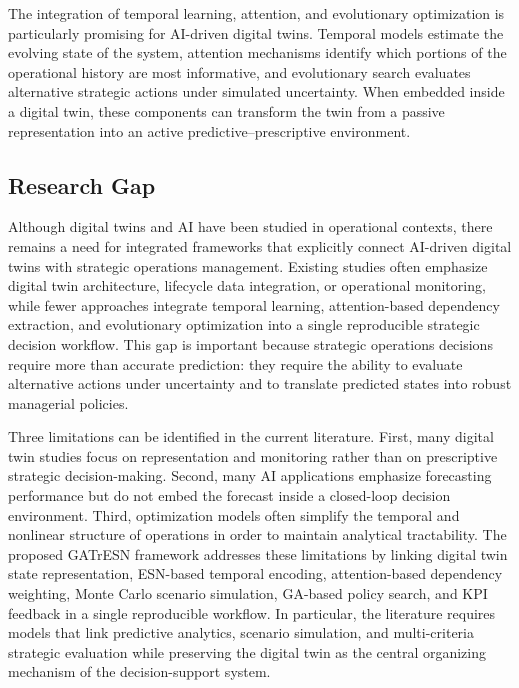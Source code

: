 \documentclass[apajournal,article,submit,pdftex,moreauthors]{Definitions/mdpi}
\begin{document}
The integration of temporal learning, attention, and evolutionary optimization is particularly promising for AI-driven digital twins. Temporal models estimate the evolving state of the system, attention mechanisms identify which portions of the operational history are most informative, and evolutionary search evaluates alternative strategic actions under simulated uncertainty. When embedded inside a digital twin, these components can transform the twin from a passive representation into an active predictive--prescriptive environment.

\subsection{Research Gap}
Although digital twins and AI have been studied in operational contexts, there remains a need for integrated frameworks that explicitly connect AI-driven digital twins with strategic operations management. Existing studies often emphasize digital twin architecture, lifecycle data integration, or operational monitoring, while fewer approaches integrate temporal learning, attention-based dependency extraction, and evolutionary optimization into a single reproducible strategic decision workflow. This gap is important because strategic operations decisions require more than accurate prediction: they require the ability to evaluate alternative actions under uncertainty and to translate predicted states into robust managerial policies.

Three limitations can be identified in the current literature. First, many digital twin studies focus on representation and monitoring rather than on prescriptive strategic decision-making. Second, many AI applications emphasize forecasting performance but do not embed the forecast inside a closed-loop decision environment. Third, optimization models often simplify the temporal and nonlinear structure of operations in order to maintain analytical tractability. The proposed GATrESN framework addresses these limitations by linking digital twin state representation, ESN-based temporal encoding, attention-based dependency weighting, Monte Carlo scenario simulation, GA-based policy search, and KPI feedback in a single reproducible workflow. In particular, the literature requires models that link predictive analytics, scenario simulation, and multi-criteria strategic evaluation while preserving the digital twin as the central organizing mechanism of the decision-support system.

\end{document}
